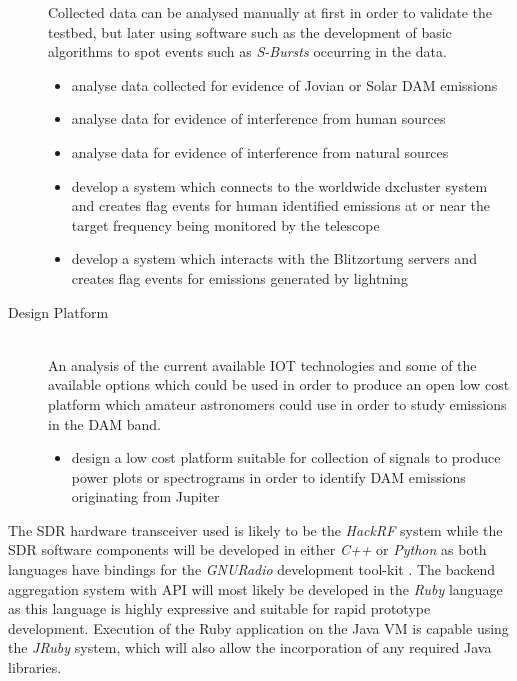 \begin{description}
    Collected data can be analysed manually at first in order to validate the testbed, but later using software such as the development of basic algorithms to spot events such as \textit{S-Bursts} occurring in the data.
    \begin{itemize}
      \item analyse data collected for evidence of Jovian or Solar \gls{DAM} emissions
      \item analyse data for evidence of interference from human sources
      \item analyse data for evidence of interference from natural sources
      \item develop a system which connects to the worldwide dxcluster system and creates flag events for human identified emissions at or near the target frequency being monitored by the telescope
      \item develop a system which interacts with the Blitzortung servers and creates flag events for emissions generated by lightning \\
    \end{itemize}
  \item [Design Platform] \hfill \\
    An analysis of the current available \gls{IOT} technologies and some of the available options which could be used in order to produce an open low cost platform which amateur astronomers could use in order to study emissions in the \gls{DAM} band.
    \begin{itemize}
      \item design a low cost platform suitable for collection of signals to produce power plots or spectrograms in order to identify \gls{DAM} emissions originating from Jupiter\\
    \end{itemize}
\end{description}


The \gls{SDR} hardware transceiver used is likely to be the \textit{HackRF} system while the \gls{SDR} software components will be developed in either \textit{C++} or \textit{Python} as both languages have bindings for the \textit{GNURadio} development tool-kit \citep{gnuradio-14}. The backend aggregation system with API will most likely be developed in the \textit{Ruby} language as this language is highly expressive and suitable for rapid prototype development. Execution of the Ruby application on the Java VM is capable using the \textit{JRuby} system, which will also allow the incorporation of any required Java libraries.

